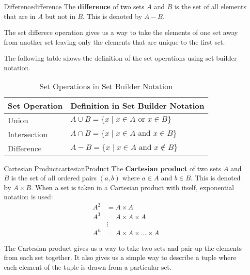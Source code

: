 \begin{definition}{Difference}{difference}
  The \textbf{difference} of two sets \( A \) and \( B \) is the set of all
  elements that are in \( A \) but not in \( B \). This is denoted by \( A - B \).
\end{definition}

The set differece operation gives us a way to take the elements of one set away from another set
leaving only the elements that are unique to the first set.

The following table shows the definition of the set operations using set builder notation.
\begin{table}[H]
  \centering
  \begin{tabular}{p{1in} p{3in}}
    \toprule
    \textbf{Set Operation} & \textbf{Definition in Set Builder Notation} \\
    \midrule
    Union & \( A \cup B = \{ x \mid x \in A \text{ or } x \in B \} \) \\
    Intersection & \( A \cap B = \{ x \mid x \in A \text{ and } x \in B \} \) \\
    Difference & \( A - B = \{ x \mid x \in A \text{ and } x \notin B \} \) \\
    \bottomrule
  \end{tabular}
  \caption{Set Operations in Set Builder Notation}
\end{table}

\begin{definition}{Cartesian Product}{cartesianProduct}
  The \textbf{Cartesian product} of two sets \( A \) and \( B \) is the set of all
  ordered pairs \( (a, b) \) where \( a \in A \) and \( b \in B \). This is denoted by
  \( A \times B \).
  \medskip
  When a set is taken in a Cartesian product with itself, exponential notation is used:
  \begin{align*}
    A^2 &= A \times A \\
    A^3 &= A \times A \times A \\
    &\vdots \\
    A^n &= A \times A \times \ldots \times A
  \end{align*}
\end{definition}

The Cartesian product gives us a way to take two sets and pair up the elements from each set together.
It also gives us a simple way to describe a tuple where each element of the tuple is drawn from a
particular set.

